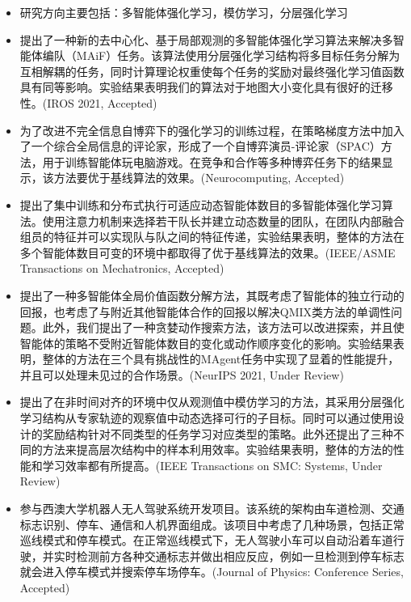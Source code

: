 
{\small
  \begin{itemize}
    \item 研究方向主要包括：多智能体强化学习，模仿学习，分层强化学习
    \item 提出了一种新的去中心化、基于局部观测的多智能体强化学习算法来解决多智能体编队（MAiF）任务。该算法使用分层强化学习结构将多目标任务分解为互相解耦的任务，同时计算理论权重使每个任务的奖励对最终强化学习值函数具有同等影响。实验结果表明我们的算法对于地图大小变化具有很好的迁移性。(IROS 2021, Accepted)
    \item 为了改进不完全信息自博弈下的强化学习的训练过程，在策略梯度方法中加入了一个综合全局信息的评论家，形成了一个自博弈演员-评论家（SPAC）方法，用于训练智能体玩电脑游戏。在竞争和合作等多种博弈任务下的结果显示，该方法要优于基线算法的效果。(Neurocomputing, Accepted)
    \item 提出了集中训练和分布式执行可适应动态智能体数目的多智能体强化学习算法。使用注意力机制来选择若干队长并建立动态数量的团队，在团队内部融合组员的特征并可以实现队与队之间的特征传递，实验结果表明，整体的方法在多个智能体数目可变的环境中都取得了优于基线算法的效果。(IEEE/ASME Transactions on Mechatronics, Accepted)
    \item 提出了一种多智能体全局价值函数分解方法，其既考虑了智能体的独立行动的回报，也考虑了与附近其他智能体合作的回报以解决QMIX类方法的单调性问题。此外，我们提出了一种贪婪动作搜索方法，该方法可以改进探索，并且使智能体的策略不受附近智能体数目的变化或动作顺序变化的影响。实验结果表明，整体的方法在三个具有挑战性的MAgent任务中实现了显着的性能提升，并且可以处理未见过的合作场景。(NeurIPS 2021, Under Review)
    \item 提出了在非时间对齐的环境中仅从观测值中模仿学习的方法，其采用分层强化学习结构从专家轨迹的观察值中动态选择可行的子目标。同时可以通过使用设计的奖励结构针对不同类型的任务学习对应类型的策略。此外还提出了三种不同的方法来提高层次结构中的样本利用效率。实验结果表明，整体的方法的性能和学习效率都有所提高。(IEEE Transactions on SMC: Systems, Under Review)
  \end{itemize}
}

{\small
  \begin{itemize}
    \item 参与西澳大学机器人无人驾驶系统开发项目。该系统的架构由车道检测、交通标志识别、停车、通信和人机界面组成。该项目中考虑了几种场景，包括正常巡线模式和停车模式。在正常巡线模式下，无人驾驶小车可以自动沿着车道行驶，并实时检测前方各种交通标志并做出相应反应，例如一旦检测到停车标志就会进入停车模式并搜索停车场停车。(Journal of Physics: Conference Series, Accepted)
  \end{itemize}
}


